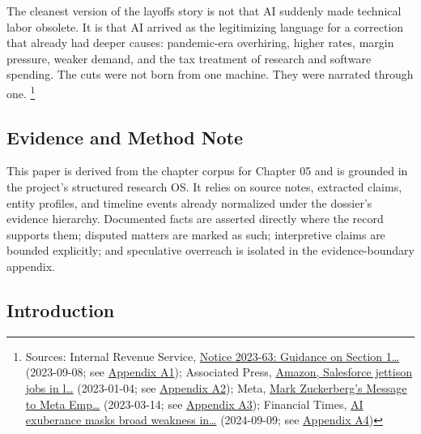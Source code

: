 \documentclass[
  american,
  11pt,
  letterpaper,
]{article}
\begin{document}
The cleanest version of the layoffs story is not that AI suddenly made
technical labor obsolete. It is that AI arrived as the legitimizing
language for a correction that already had deeper causes: pandemic-era
overhiring, higher rates, margin pressure, weaker demand, and the tax
treatment of research and software spending. The cuts were not born from
one machine. They were narrated through one. \footnote{Sources: Internal
  Revenue Service,
  \href{https://www.irs.gov/pub/irs-drop/n-23-63.pdf}{Notice 2023-63:
  Guidance on Section 1\ldots{}} (2023-09-08; see
  \hyperref[appendix-a1-notice-2023-63-guidance-on-section-174-and-specified-research-or-experimental-expenditures]{Appendix
  A1}); Associated Press,
  \href{https://apnews.com/article/bbb2f3a09eafdfc7cda54a3b87e538ad}{Amazon,
  Salesforce jettison jobs in l\ldots{}} (2023-01-04; see
  \hyperref[appendix-a2-amazon-salesforce-jettison-jobs-in-latest-tech-worker-purge]{Appendix
  A2}); Meta,
  \href{https://about.fb.com/news/2023/03/mark-zuckerberg-meta-year-of-efficiency/}{Mark
  Zuckerberg's Message to Meta Emp\ldots{}} (2023-03-14; see
  \hyperref[appendix-a3-mark-zuckerberg-s-message-to-meta-employees]{Appendix
  A3}); Financial Times,
  \href{https://www.ft.com/content/0b14d871-2d19-46f1-9660-5466301e8066}{AI
  exuberance masks broad weakness in\ldots{}} (2024-09-09; see
  \hyperref[appendix-a4-ai-exuberance-masks-broad-weakness-in-tech-sector-say-investors]{Appendix
  A4})}

\subsection{Evidence and Method Note}\label{evidence-and-method-note}

This paper is derived from the chapter corpus for Chapter 05 and is
grounded in the project's structured research OS. It relies on source
notes, extracted claims, entity profiles, and timeline events already
normalized under the dossier's evidence hierarchy. Documented facts are
asserted directly where the record supports them; disputed matters are
marked as such; interpretive claims are bounded explicitly; and
speculative overreach is isolated in the evidence-boundary appendix.

\subsection{Introduction}\label{introduction}
\end{document}
